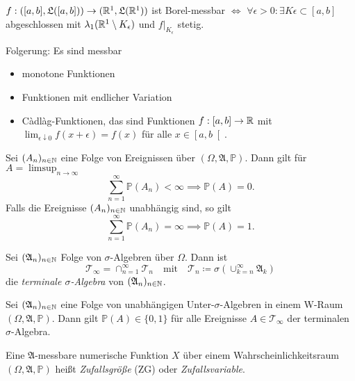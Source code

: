 \documentclass{cheat-sheet}
\newcommand{\Alg}{\mathfrak{A}}
\newcommand{\LebAlg}{\mathfrak{L}} %
\renewcommand{\P}{\mathbb{P}}
\begin{document}
\begin{satz}
  $f : ([a, b], \LebAlg([a, b])) \to (\R^1, \LebAlg(\R^1))$ ist Borel-messbar $\iff$ $\forall \epsilon > 0 : \exists K\epsilon \subset [a, b]$ abgeschlossen mit $\lambda_1(\mathbb{R}^1 \setminus K_\epsilon)$ und $f|_{K_\epsilon}$ stetig.
\end{satz}

\begin{satz}
  Folgerung: Es sind messbar
  \begin{itemize}
    \item monotone Funktionen
    \item Funktionen mit endlicher Variation
    \item Càdlàg-Funktionen, das sind Funktionen $f : [a, b] \to \mathbb{R}$ mit $\lim_{\epsilon \downarrow 0} f(x+\epsilon) = f(x)$ für alle $x \in \left[a, b\right[$.
  \end{itemize}
\end{satz}

\begin{lem}
  Sei $(A_n)_{n \in \mathbb{N}}$ eine Folge von Ereignissen über $(\Omega, \Alg, \P)$. Dann gilt für $A = \limsup_{n \to \infty}$
  \[ \sum_{n=1}^\infty \P(A_n) < \infty \implies \P(A) = 0. \]
  Falls die Ereignisse $(A_n)_{n \in \mathbb{N}}$ unabhängig sind, so gilt
  \[ \sum_{n=1}^\infty \P(A_n) = \infty \implies \P(A) = 1. \]
\end{lem}

\begin{defn}
  Sei $(\Alg_n)_{n \in \N}$ Folge von $\sigma$-Algebren über $\Omega$. Dann ist
  \[ \mathcal{T}_\infty = \cap_{n=1}^\infty \mathcal{T}_n \quad \text{mit} \quad \mathcal{T}_n \coloneqq \sigma \left( \cup_{k=n}^\infty \Alg_k \right) \]
  die \emph{terminale $\sigma$-Algebra} von $(\Alg_n)_{n \in \N}$.
\end{defn}


\begin{satz}
  Sei $(\Alg_n)_{n \in \N}$ eine Folge von unabhängigen Unter-$\sigma$-Algebren in einem W-Raum $(\Omega, \Alg, \P)$. Dann gilt $\P(A) \in \{ 0, 1 \}$ für alle Ereignisse $A \in \mathcal{T}_\infty$ der terminalen $\sigma$-Algebra.
\end{satz}

\begin{defn}
  Eine $\Alg$-messbare numerische Funktion $X$ über einem Wahrscheinlichkeitsraum $(\Omega, \Alg, \P)$ heißt \emph{Zufallsgröße} (ZG) oder \emph{Zufallsvariable}.
\end{defn}
\end{document}
